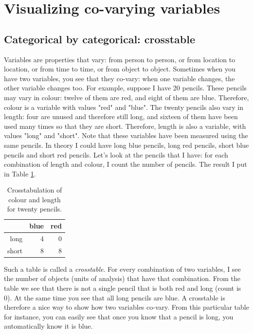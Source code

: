 \documentclass[]{book}\usepackage[]{graphicx}\usepackage[]{color}
\begin{document}
\section{Visualizing co-varying variables}

\subsection{Categorical by categorical: crosstable}

Variables are properties that vary: from person to person, or from location to location, or from time to time, or from object to object. Sometimes when you have two variables, you see that they co-vary: when one variable changes, the other variable changes too. For example, suppose I have 20 pencils. These pencils may vary in colour: twelve of them are red, and eight of them are blue. Therefore, colour is a variable with values "red" and "blue". The twenty pencils also vary in length: four are unused and therefore still long, and sixteen of them have been used many times so that they are short. Therefore, length is also a variable, with values "long" and "short". Note that these variables have been measured using the same pencils. In theory I could have long blue pencils, long red pencils, short blue pencils and short red pencils. Let's look at the pencils that I have: for each combination of length and colour, I count the number of pencils. The result I put in Table \ref{tab:crosstable_1}.

\begin{table}[ht]
\centering
\caption{Crosstabulation of colour and length for twenty pencils.} 
\label{tab:crosstable_1}
\begin{tabular}{rrr}
  \hline
 & blue & red \\ 
  \hline
long & 4 & 0 \\ 
  short & 8 & 8 \\ 
   \hline
\end{tabular}
\end{table}


Such a table is called a \textit{crosstable}. For every combination of two variables, I see the number of objects (units of analysis) that have that combination. From the table we see that there is not a single pencil that is both red and long (count is 0). At the same time you see that all long pencils are blue. A crosstable is therefore a nice way to show how two variables co-vary. From this particular table for instance, you can easily see that once you know that a pencil is long, you automatically know it is blue.
\end{document}
